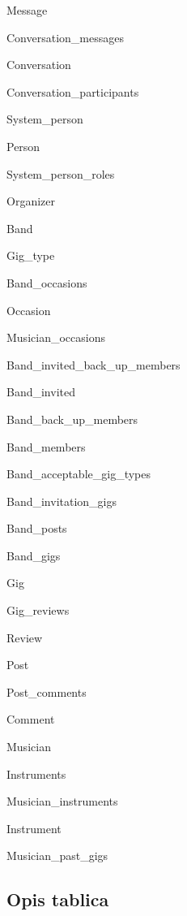 		\begin{packed_item}
		\item Message
		\item Conversation\_messages
		\item Conversation
		\item Conversation\_participants
		\item System\_person
		\item Person
		\item System\_person\_roles
		\item Organizer
		\item Band 
		\item Gig\_type
		\item Band\_occasions
		\item Occasion
		\item Musician\_occasions
		\item Band\_invited\_back\_up\_members
		\item Band\_invited 
		\item Band\_back\_up\_members
		\item Band\_members
		\item Band\_acceptable\_gig\_types
		\item Band\_invitation\_gigs
		\item Band\_posts	
		\item Band\_gigs
		\item Gig
		\item Gig\_reviews
		\item Review
		\item Post
		\item Post\_comments
		\item Comment
		\item Musician
		\item Instruments
		\item Musician\_instruments
		\item Instrument
		\item Musician\_past\_gigs
		
		
	\end{packed_item}
	
	
	\subsection{Opis tablica}
	
